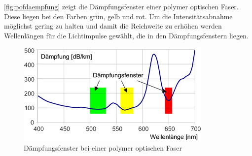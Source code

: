 \autoref{fig:pofdaempfung} zeigt die Dämpfungsfenster einer polymer optischen
Faser. Diese liegen bei den Farben grün, gelb und rot. Um die Intensitätsabnahme
möglichst gering zu halten und damit die Reichweite zu erhöhen werden
Wellenlängen für die Lichtimpulse gewählt, die in den Dämpfungsfenstern liegen.

\begin{figure}[h]
    \begin{center}
        \begin{minipage}[t]{0.4\textwidth}
            \begin{center}
                \includegraphics[height=0.1\textheight]{Bilder/Optische_Wellenleiter_Die_Polymer_Optische_Faser/Funktionsweise/pofdaempfung.png}
                \caption[Dämpfungsfenster bei einer polymer optischen Faser \newline \url{http://www.pofac.fh-nuernberg.de/pofac/de/was_sind_pof/stufenindex.php}]{Dämpfungsfenster bei einer polymer optischen Faser} %
                \label{fig:pofdaempfung}
            \end{center}
        \end{minipage}
    \end{center}
\end{figure}
